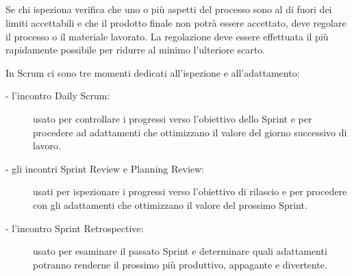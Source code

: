 \subsection*{\color{Blue}{LA TERZA  COLONNA \`E  L'ADATTAMENTO}}
Se chi  ispeziona verifica che uno o pi\`u aspetti del processo sono al di fuori dei limiti accettabili 
e che il prodotto finale non potr\`a essere accettato, deve regolare il processo o il
materiale lavorato.  La regolazione  deve essere  effettuata il  pi\`u rapidamente
possibile per ridurre al minimo l'ulteriore scarto.

In Scrum ci sono tre momenti dedicati all'ispezione e all'adattamento:
\begin{description}
\item[- l'incontro Daily  Scrum:]
	usato per controllare i progressi verso l'obiettivo dello Sprint e per procedere ad
	adattamenti  che  ottimizzano il  valore  del giorno  successivo  di lavoro.
\item[- gli incontri Sprint Review e  Planning Review:]
	usati per ispezionare i progressi  verso l'obiettivo di rilascio e per procedere con gli
	adattamenti che ottimizzano il valore del prossimo Sprint.
\item[- l'incontro Sprint Retrospective:]
	usato  per  esaminare il passato Sprint e determinare quali
	adattamenti potranno renderne il prossimo pi\`u produttivo, appagante  e
	divertente.
\end{description}
